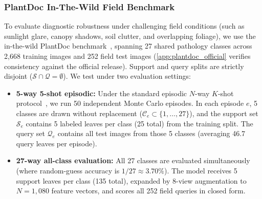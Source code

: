 \subsubsection{PlantDoc In-The-Wild Field Benchmark}
To evaluate diagnostic robustness under challenging field conditions (such as sunlight glare, canopy shadows, soil clutter, and overlapping foliage), we use the in-the-wild PlantDoc benchmark~\cite{singh2020plantdoc}, spanning 27 shared pathology classes across 2{,}668 training images and 252 field test images (\ref{app:plantdoc_official} verifies consistency against the official release). Support and query splits are strictly disjoint ($\mathcal{S} \cap \mathcal{Q} = \emptyset$). We test under two evaluation settings:
\begin{itemize}
    \item \textbf{5-way 5-shot episodic:} Under the standard episodic $N$-way $K$-shot protocol~\cite{snell2017prototypical}, we run 50 independent Monte Carlo episodes. In each episode $e$, 5 classes are drawn without replacement ($\mathcal{C}_e \subset \{1, \dots, 27\}$), and the support set $\mathcal{S}_e$ contains 5 labeled leaves per class (25 total) from the training split. The query set $\mathcal{Q}_e$ contains all test images from those 5 classes (averaging 46.7 query leaves per episode).
    \item \textbf{27-way all-class evaluation:} All 27 classes are evaluated simultaneously (where random-guess accuracy is $1/27 \approx 3.70\%$). The model receives 5 support leaves per class (135 total), expanded by 8-view augmentation to $N = 1{,}080$ feature vectors, and scores all 252 field queries in closed form.
\end{itemize}

